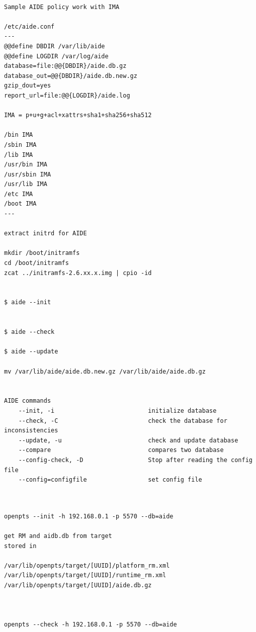 \documentclass[12pt,a4paper]{article}
\begin{document}
\begin{verbatim}

Sample AIDE policy work with IMA

/etc/aide.conf
---
@@define DBDIR /var/lib/aide
@@define LOGDIR /var/log/aide
database=file:@@{DBDIR}/aide.db.gz
database_out=@@{DBDIR}/aide.db.new.gz
gzip_dout=yes
report_url=file:@@{LOGDIR}/aide.log

IMA = p+u+g+acl+xattrs+sha1+sha256+sha512

/bin IMA
/sbin IMA
/lib IMA
/usr/bin IMA
/usr/sbin IMA
/usr/lib IMA
/etc IMA
/boot IMA
---

extract initrd for AIDE

mkdir /boot/initramfs
cd /boot/initramfs
zcat ../initramfs-2.6.xx.x.img | cpio -id


$ aide --init


$ aide --check

$ aide --update

mv /var/lib/aide/aide.db.new.gz /var/lib/aide/aide.db.gz


AIDE commands         
    --init, -i                          initialize database
    --check, -C                         check the database for inconsistencies
    --update, -u                        check and update database
    --compare                           compares two database
    --config-check, -D                  Stop after reading the config file
    --config=configfile                 set config file


\end{verbatim}


\begin{verbatim}

openpts --init -h 192.168.0.1 -p 5570 --db=aide

get RM and aidb.db from target
stored in

/var/lib/openpts/target/[UUID]/platform_rm.xml
/var/lib/openpts/target/[UUID]/runtime_rm.xml
/var/lib/openpts/target/[UUID]/aide.db.gz



openpts --check -h 192.168.0.1 -p 5570 --db=aide





\end{verbatim}




%
%
%
\end{document}
